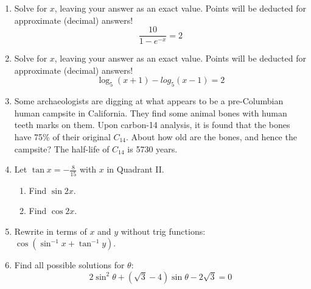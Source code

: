 \documentclass[letterpaper,12pt,fleqn]{article}
\begin{document}
\begin{enumerate}
\vspace{2in}

\item Solve for $x$, leaving your answer as an exact value.  Points will be
deducted for approximate (decimal) answers!
\[\frac{10}{1-e^{-x}}=2\]

\vspace{2in}

\item Solve for $x$, leaving your answer as an exact value.  Points will be
deducted for approximate (decimal) answers!
\[\log_5(x+1)-log_5(x-1)=2\]

\newpage

\item Some archaeologists are digging at what appears to be a pre-Columbian
human campsite in California.  They find some animal bones with human teeth
marks on them.  Upon carbon-14 analysis, it is found that the bones have 75\%
of their original $C_{14}$.  About how old are the bones, and hence the
campsite?  The half-life of $C_{14}$ is 5730 years.

\vspace{3in}

\item Let $\tan x=-\frac{8}{15}$ with $x$ in Quadrant II.
\begin{enumerate}
\item Find $\sin2x$.

\vspace {3in}

\item Find $\cos2x$.
\end{enumerate}

\vspace {2in}

\item Rewrite in terms of $x$ and $y$ without trig functions:
$\cos(\sin^{-1}x+\tan^{-1}y)$.

\vspace{3in}

\item Find all possible solutions for $\theta$:
\[2\sin^2\theta+(\sqrt{3}-4)\sin\theta-2\sqrt{3}=0\]

\end{enumerate}
\end{document}
